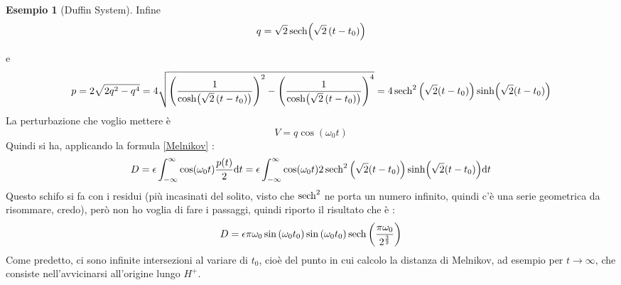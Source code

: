 \documentclass[a4paper,12pt]{article}
\theoremstyle{plain}
\theoremstyle{definition}
\newtheorem{exmp}{Esempio}[section]
\newcommand{\f}[2]{\frac{#1}{#2}}
\renewcommand{\d}{\text{d}}
\newcommand{\ra}{\rightarrow}
\theoremstyle{remark}
\begin{document}
\begin{exmp}[Duffin System]
 	 Infine\[q={\sqrt{2}}\sech({\sqrt{2}}\left(t-t_0\right))		\]
 	 
 	 e \[p=2\sqrt{2q^2-q^4}=4\sqrt{\left(\f{1}{\cosh({\sqrt{2}}\left(t-t_0\right))}\right)^2-\left(\f{1}{\cosh({\sqrt{2}}\left(t-t_0\right))}\right)^4}=4\sech^2\left(\sqrt{2}(t-t_0)\right) \sinh(\sqrt{2}(t-t_0))		\]
 	 La perturbazione che voglio mettere è \[V=q\cos(\omega_0 t)\]
 	 Quindi si ha, applicando la formula \ref{Melnikov} :
 	 \[D=\epsilon\int_{-\infty}^{\infty}	\cos(\omega_0 t)\f{p(t)}{2}\d t=\epsilon\int_{-\infty}^{\infty}	\cos(\omega_0 t)2\sech^2\left(\sqrt{2}(t-t_0)\right) \sinh(\sqrt{2}(t-t_0))		\d t	\]
 Questo schifo si fa con i residui (più incasinati del solito, visto che $\sech^2$ ne porta un numero infinito, quindi c'è una serie geometrica da risommare, credo), però non ho voglia di fare i passaggi, quindi riporto il risultato che è :
 \[D=\epsilon \pi \omega_0		\sin\left({\omega_0 t_0}\right)			\sin\left({\omega_0 t_0}\right)		\sech\left(\f{\pi\omega_0}{2^\f{3}{2}}\right)	\]
Come predetto, ci sono infinite intersezioni al variare di $t_0$, cioè del punto in cui calcolo la distanza di Melnikov, ad esempio per $t\ra\infty$, che consiste nell'avvicinarsi all'origine lungo $H^+$.

\end{exmp}
\end{document}

